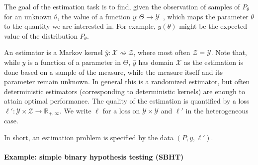 The goal of the estimation task is to find, given the observation of samples of $P_\theta$ for an unknown $\theta$, the value of a function $y : \Theta \to \mathcal Y$~, which maps the parameter $\theta$ to the quantity we are interested in. For example, $y(\theta)$ might be the expected value of the distribution $P_\theta$.

An estimator is a Markov kernel $\hat{y} : \mathcal X \rightsquigarrow \mathcal Z$, where most often $\mathcal Z = \mathcal Y$.
Note that, while $y$ is a function of a parameter in $\Theta$, $\hat{y}$ has domain $\mathcal X$ as the estimation is done based on a sample of the measure, while the measure itself and its parameter remain unknown.
In general this is a randomized estimator, but often deterministic estimators (corresponding to deterministic kernels) are enough to attain optimal performance.
The quality of the estimation is quantified by a loss $\ell' : \mathcal Y \times \mathcal Z \to \mathbb{R}_{+, \infty}$. We write $\ell$ for a loss on $\mathcal Y \times \mathcal Y$ and $\ell'$ in the heterogeneous case.

In short, an estimation problem is specified by the data $(P, y, \ell')$.



\paragraph{Example: simple binary hypothesis testing (SBHT)}


